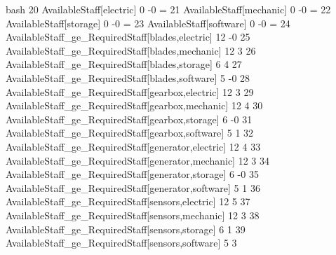     \newpage
    \vspace{2pt}
    \begin{boxminted}{bash}
        20 AvailableStaff[electric]
        0            -0             = 
        21 AvailableStaff[mechanic]
                0            -0             = 
        22 AvailableStaff[storage]
                0            -0             = 
        23 AvailableStaff[software]
                0            -0             = 
        24 AvailableStaff_ge_RequiredStaff[blades,electric]
            12            -0               
        25 AvailableStaff_ge_RequiredStaff[blades,mechanic]
            12             3               
        26 AvailableStaff_ge_RequiredStaff[blades,storage]
                6             4               
        27 AvailableStaff_ge_RequiredStaff[blades,software]
                5            -0               
        28 AvailableStaff_ge_RequiredStaff[gearbox,electric]
            12             3               
        29 AvailableStaff_ge_RequiredStaff[gearbox,mechanic]
            12             4               
        30 AvailableStaff_ge_RequiredStaff[gearbox,storage]
                6            -0               
        31 AvailableStaff_ge_RequiredStaff[gearbox,software]
                5             1               
        32 AvailableStaff_ge_RequiredStaff[generator,electric]
            12             4               
        33 AvailableStaff_ge_RequiredStaff[generator,mechanic]
            12             3               
        34 AvailableStaff_ge_RequiredStaff[generator,storage]
                6            -0               
        35 AvailableStaff_ge_RequiredStaff[generator,software]
                5             1               
        36 AvailableStaff_ge_RequiredStaff[sensors,electric]
            12             5               
        37 AvailableStaff_ge_RequiredStaff[sensors,mechanic]
            12             3               
        38 AvailableStaff_ge_RequiredStaff[sensors,storage]
                6             1               
        39 AvailableStaff_ge_RequiredStaff[sensors,software]
                5             3               
    \end{boxminted}
    \newpage
    \vspace{2pt}
